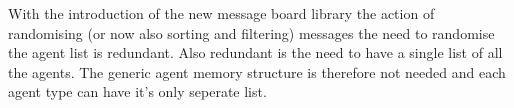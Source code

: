 With the introduction of the new message board library the action of randomising
(or now also sorting and filtering) messages the need to randomise the agent list
is redundant. Also redundant is the need to have a single list of all the agents.
The generic agent memory structure is therefore not needed and each agent type
can have it's only seperate list.
